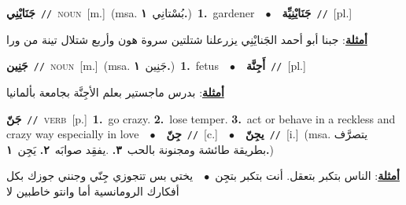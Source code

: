 \documentclass[10pt,a4paper,twoside]{article} %
\begin{document}
\begin{multicols}{2}
{\setlength\topsep{0pt}\textbf{\foreignlanguage{arabic}{جَنَايْنِي}}\ {\color{gray}\texttt{//}\color{black}}\ \textsc{noun}\ [m.]\ \color{gray}(msa. \foreignlanguage{arabic}{بُسْتانِي}~\foreignlanguage{arabic}{\textbf{١.}})\color{black}\ \textbf{1.}~gardener\ \ $\bullet$\ \ \setlength\topsep{0pt}\textbf{\foreignlanguage{arabic}{جَنَايْنِيِّة}}\ {\color{gray}\texttt{//}\color{black}}\ [pl.]\  \begin{flushright}\color{gray}\foreignlanguage{arabic}{\textbf{\underline{\foreignlanguage{arabic}{أمثلة}}}: جبنا أبو أحمد الجَنايْنِي يزرعلنا شتلتين سروة هون وأربع شتلال تينة من ورا}\end{flushright}\color{black}} \vspace{2mm}

{\setlength\topsep{0pt}\textbf{\foreignlanguage{arabic}{جَنِين}}\ {\color{gray}\texttt{//}\color{black}}\ \textsc{noun}\ [m.]\ \color{gray}(msa. \foreignlanguage{arabic}{جَنِين}~\foreignlanguage{arabic}{\textbf{١.}})\color{black}\ \textbf{1.}~fetus\ \ $\bullet$\ \ \setlength\topsep{0pt}\textbf{\foreignlanguage{arabic}{أَجِنَّة}}\ {\color{gray}\texttt{//}\color{black}}\ [pl.]\  \begin{flushright}\color{gray}\foreignlanguage{arabic}{\textbf{\underline{\foreignlanguage{arabic}{أمثلة}}}: بدرس ماجستير بعلم الأجِنَّة بجامعة بألمانيا}\end{flushright}\color{black}} \vspace{2mm}

{\setlength\topsep{0pt}\textbf{\foreignlanguage{arabic}{جَنّ}}\ {\color{gray}\texttt{//}\color{black}}\ \textsc{verb}\ [p.]\ \textbf{1.}~go crazy.  \textbf{2.}~lose temper.  \textbf{3.}~act or behave in a reckless and crazy way especially in love\ \ $\bullet$\ \ \setlength\topsep{0pt}\textbf{\foreignlanguage{arabic}{جِنّ}}\ {\color{gray}\texttt{//}\color{black}}\ [c.]\ \ $\bullet$\ \ \setlength\topsep{0pt}\textbf{\foreignlanguage{arabic}{يجِنّ}}\ {\color{gray}\texttt{//}\color{black}}\ [i.]\ \color{gray}(msa. \foreignlanguage{arabic}{يتصرَّف بطريقة طائشة ومجنونة بالحب}~\foreignlanguage{arabic}{\textbf{٣.}}  .\foreignlanguage{arabic}{يفقِد صوابَه}~\foreignlanguage{arabic}{\textbf{٢.}}  \foreignlanguage{arabic}{يَجِن}~\foreignlanguage{arabic}{\textbf{١.}})\color{black}\  \begin{flushright}\color{gray}\foreignlanguage{arabic}{\textbf{\underline{\foreignlanguage{arabic}{أمثلة}}}: الناس بتكبر بتعقل. أنت بتكبر بتجِن\ $\bullet$\ \  يختي بس تتجوزي جِنّي وجنني جوزك بكل أفكارك الرومانسية أما وانتو خاطبين لا}\end{flushright}\color{black}} \vspace{2mm}


\end{multicols}
\end{document}
